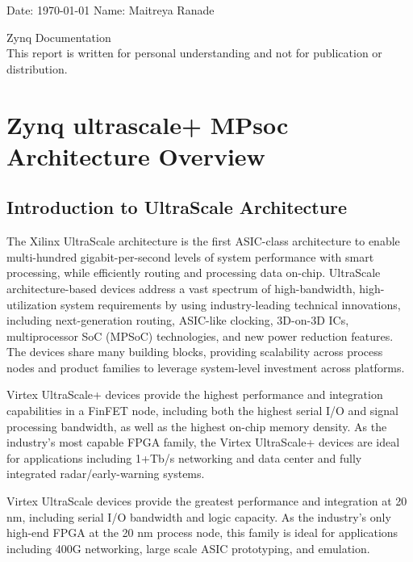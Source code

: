 \documentclass[12pt, a4paper]{report}
\begin{document}
	\onehalfspacing
	Date: \today{} \hfill{} Name: Maitreya Ranade   
	\begin{center}
		\vspace*{\fill}
		{\LARGE Zynq Documentation} \\
		This report is written for personal understanding and not for publication or distribution.
		\vspace*{\fill}
	\end{center}
	
	\pagebreak
	\singlespacing
	\tableofcontents
	\pagebreak


    \chapter{Zynq ultrascale+ MPsoc Architecture Overview}

    \section{Introduction to UltraScale Architecture}
    The Xilinx UltraScale architecture is the first ASIC-class architecture to enable
    multi-hundred gigabit-per-second levels of system performance with smart processing,
    while efficiently routing and processing data on-chip. UltraScale architecture-based devices
    address a vast spectrum of high-bandwidth, high-utilization system requirements by using
    industry-leading technical innovations, including next-generation routing, ASIC-like
    clocking, 3D-on-3D ICs, multiprocessor SoC (MPSoC) technologies, and new power
    reduction features. The devices share many building blocks, providing scalability across
    process nodes and product families to leverage system-level investment across platforms.


    Virtex UltraScale+ devices provide the highest performance and integration capabilities
    in a FinFET node, including both the highest serial I/O and signal processing bandwidth, as
    well as the highest on-chip memory density. As the industry's most capable FPGA family,
    the Virtex UltraScale+ devices are ideal for applications including 1+Tb/s networking and
    data center and fully integrated radar/early-warning systems.
    

    Virtex UltraScale devices provide the greatest performance and integration at 20 nm,
    including serial I/O bandwidth and logic capacity. As the industry's only high-end FPGA at
    the 20 nm process node, this family is ideal for applications including 400G networking,
    large scale ASIC prototyping, and emulation.
\end{document}
